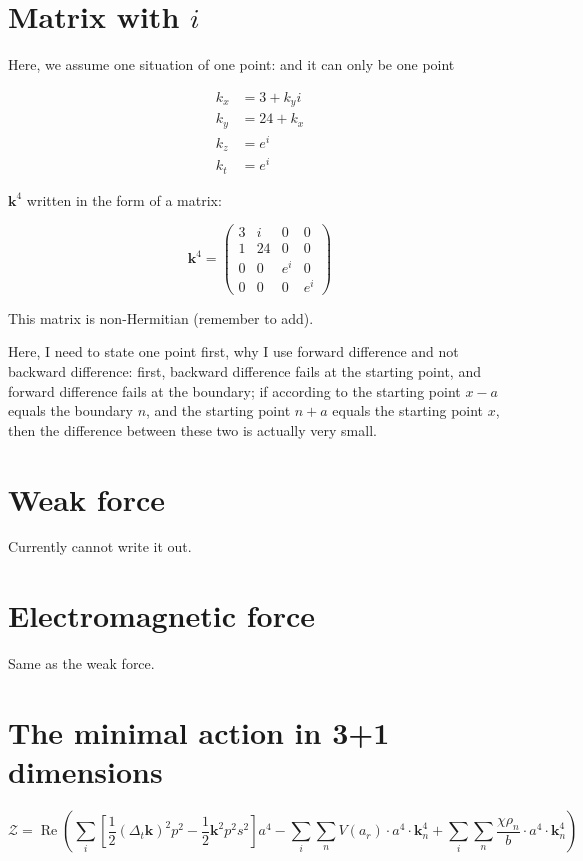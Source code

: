 \documentclass[UTF8]{article}
\begin{document}
\section{Matrix with \(i\)}

Here, we assume one situation of one point: and it can only be one point

\begin{align*}
k_x &= 3+k_yi\\
k_y &= 24+k_x\\
k_z &= e^i\\
k_t &= e^i
\end{align*}

\(\mathbf{k}^4\) written in the form of a matrix:

\begin{equation}
\mathbf{k}^4=
\begin{pmatrix}
3 & i & 0 & 0\\
1 & 24 & 0 & 0\\
0 & 0 & e^i & 0\\
0 & 0 & 0 & e^i
\end{pmatrix}
\end{equation}

This matrix is non-Hermitian (remember to add).

Here, I need to state one point first, why I use forward difference and not backward difference: first, backward difference fails at the starting point, and forward difference fails at the boundary; if according to the starting point \(x-a\) equals the boundary \(n\), and the starting point \(n+a\) equals the starting point \(x\), then the difference between these two is actually very small.

\section{Weak force}

Currently cannot write it out.

\section{Electromagnetic force}

Same as the weak force.

\section{The minimal action in 3+1 dimensions}

\begin{equation}
\mathcal{Z}=\operatorname{Re}\left(\sum_i\left[\frac{1}{2}\left(\Delta_t\mathbf{k}\right)^2p^2-\frac{1}{2}\mathbf{k}^2p^2s^2\right]a^4
-\sum_i\sum_n V(a_r)\cdot a^4\cdot\mathbf{k}^4_n
+\sum_i\sum_n\frac{\chi\rho_n}{b}\cdot a^4\cdot\mathbf{k}^4_n\right)
\end{equation}
\end{document}
